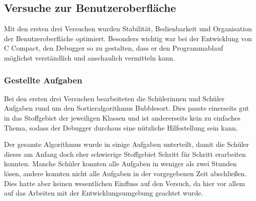 

\subsection{Versuche zur Benutzeroberfläche}
\label{sec:sci-trial-gui}
Mit den ersten drei Versuchen wurden Stabilität, Bedienbarkeit und Organisation der Benutzeroberfläche optimiert. Besonders wichtig war bei der Entwicklung von C Compact, den Debugger so zu gestalten, dass er den Programmablauf möglichst verständlich und anschaulich vermitteln kann.

\subsubsection*{Gestellte Aufgaben}
Bei den ersten drei Versuchen bearbeiteten die Schülerinnen und Schüler Aufgaben rund um den Sortieralgorithmus \glqq{}Bubblesort\grqq{}. Dies passte einerseits gut in das Stoffgebiet der jeweiligen Klassen und ist andererseits kein zu einfaches Thema, sodass der Debugger durchaus eine nützliche Hilfestellung sein kann.

Der gesamte Algorithmus wurde in einige Aufgaben unterteilt, damit die Schüler dieses am Anfang doch eher schwierige Stoffgebiet Schritt für Schritt erarbeiten konnten. Manche Schüler konnten alle Aufgaben in weniger als zwei Stunden lösen, andere konnten nicht alle Aufgaben in der vorgegebenen Zeit abschließen. Dies hatte aber keinen wesentlichen Einfluss auf den Versuch, da hier vor allem auf das Arbeiten mit der Entwicklungsumgebung geachtet wurde.

